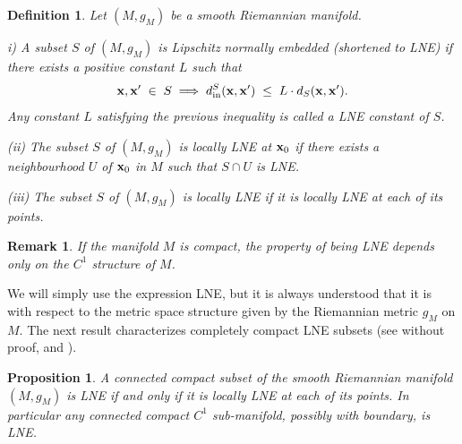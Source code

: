 \documentclass[11pt]{amsart}
\newtheorem{proposition}[theorem]{Proposition}
\newtheorem{definition}[theorem]{Definition}
\newtheorem{example}[theorem]{Example}
\newtheorem{remark}[theorem]{Remark}
\newcommand{\field}[1]{\mathbb{#1}}
\newcommand{\K}{\field{K}}
\newcommand{\R}{\field{R}}
\newcommand{\bx}{{\bf x}}
\newcommand{\inn}{{{\rm in}}}
\newcommand{\Rn}{{\R^n}}
\numberwithin{equation}{section}
\numberwithin{equation}{section}
\begin{document}
%
\begin{definition}\label{def:LNE}
	Let $(M,g_M)$ be a smooth Riemannian manifold. 
	
	\smallskip
	i) A subset $S$ of $(M,g_M)$ is \em Lipschitz normally 
	embedded \em (shortened to LNE) if 
	there exists a positive constant $L$ such 
	that
	$$
	\bx,\bx' \; \in \; S \; \Longrightarrow \; d_\inn^S(\bx,\bx') \; \leq \;
	L \cdot d_S(\bx,\bx').
	$$
	Any constant $L$ satisfying the previous inequality is called a \em LNE 
	constant of $S$. \em 
	
	\smallskip
	(ii) The subset $S$ of $(M,g_M)$ is \em locally LNE at $\bx_0$ \em if 
	there exists a neighbourhood $U$ of $\bx_0$ in $M$ such that
	$S\cap U$ is LNE.
	
	\smallskip
	(iii) The subset $S$ of $(M,g_M)$  is \em locally LNE \em if it is locally LNE 
	at each of its points.
\end{definition}
%
%
\begin{remark}
	If the manifold $M$ is compact, the property of being LNE
	depends only on the $C^1$ structure of $M$.
\end{remark}
%
%
\noindent
We will simply use the expression LNE, but it is always understood 
that it is with respect to the metric space structure given by the Riemannian 
metric $g_M$ on $M$. 
%
%
The next result characterizes completely compact LNE subsets
(see \cite[Proposition 2.1]{BiMo} without proof, \cite[Proposition 2.4]{KePeRu} and \cite[Lemma 2.6]{CoGrMi1}).
%
%
\begin{proposition}\label{lem:compact-LNE}
	A connected compact subset of the smooth Riemannian manifold $(M,g_M)$ is 
	LNE if and only if it is locally LNE at each of its points. In particular 
	any connected compact $C^1$ sub-manifold, possibly with boundary, is LNE.
\end{proposition}
%
%
\end{document}
